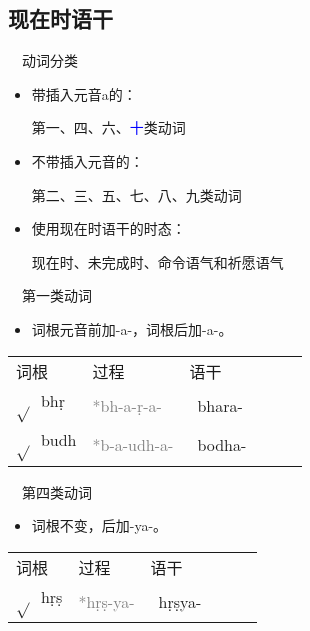 \documentclass[17pt]{beamer}
\newcommand{\skt}[1]{{\sanskritfont{#1}}} %
\newcommand{\skttrans}[1]{{\skt{#1}~#1}}  %
\newcommand{\verbroot}[1]{{$\sqrt{#1}$}}
\newcommand{\sktroot}[1]{{\verbroot{}\skt{#1}}}
\newcommand{\skttransroot}[1]{{\sktroot{#1}~#1}}
\begin{document}
\subsection{现在时语干}
\begin{frame}{\insertsubsection ~~动词分类}
  \begin{itemize}
    \item
      带插入元音a的：
      
      第一、四、六、\textcolor{blue}{十}类动词
    \item
      不带插入元音的：
      
      第二、三、五、七、八、九类动词
    \item
      使用现在时语干的时态：
      
      现在时、未完成时、命令语气和祈愿语气
  \end{itemize}  
\end{frame}

\begin{frame}{\insertsubsection ~~第一类动词}
  \small
  \begin{itemize}
    \item
      词根元音前加\nobreakdash-a\nobreakdash-，词根后加\nobreakdash-a\nobreakdash-。
  \end{itemize} 

  \centering
  \begin{tabular}{@{}llllll@{}} %
    词根 & 过程 & 语干  \\
    \skttransroot{bhṛ} & \textcolor{gray}{*bh-a-ṛ-a-} & \skttrans{bhara-}  \\
    \skttransroot{budh} & \textcolor{gray}{*b-a-udh-a-} & \skttrans{bodha-}  \\
  \end{tabular}

\end{frame}

\begin{frame}{\insertsubsection ~~第四类动词}
  \small
  \begin{itemize}
    \item
      词根不变，后加\nobreakdash-ya\nobreakdash-。
  \end{itemize} 

  \centering
  \begin{tabular}{@{}llllll@{}} %
    词根 & 过程 & 语干  \\
    \skttransroot{hṛṣ} & \textcolor{gray}{*hṛṣ-ya-} & \skttrans{hṛṣya-}  \\
  \end{tabular}

\end{frame}
\end{document}
